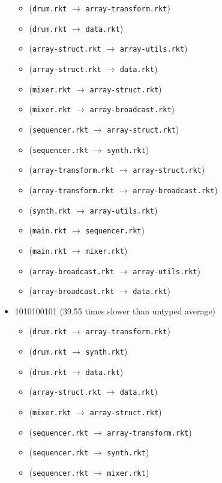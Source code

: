 \documentclass{article}
\newcommand{\mono}[1]{\texttt{#1}}
\begin{document}
\begin{itemize}
\begin{itemize}
  \item (\mono{drum.rkt} $\rightarrow$ \mono{array-transform.rkt})
  \item (\mono{drum.rkt} $\rightarrow$ \mono{data.rkt})
  \item (\mono{array-struct.rkt} $\rightarrow$ \mono{array-utils.rkt})
  \item (\mono{array-struct.rkt} $\rightarrow$ \mono{data.rkt})
  \item (\mono{mixer.rkt} $\rightarrow$ \mono{array-struct.rkt})
  \item (\mono{mixer.rkt} $\rightarrow$ \mono{array-broadcast.rkt})
  \item (\mono{sequencer.rkt} $\rightarrow$ \mono{array-struct.rkt})
  \item (\mono{sequencer.rkt} $\rightarrow$ \mono{synth.rkt})
  \item (\mono{array-transform.rkt} $\rightarrow$ \mono{array-struct.rkt})
  \item (\mono{array-transform.rkt} $\rightarrow$ \mono{array-broadcast.rkt})
  \item (\mono{synth.rkt} $\rightarrow$ \mono{array-utils.rkt})
  \item (\mono{main.rkt} $\rightarrow$ \mono{sequencer.rkt})
  \item (\mono{main.rkt} $\rightarrow$ \mono{mixer.rkt})
  \item (\mono{array-broadcast.rkt} $\rightarrow$ \mono{array-utils.rkt})
  \item (\mono{array-broadcast.rkt} $\rightarrow$ \mono{data.rkt})
  \end{itemize}
\item 1010100101 (39.55 times slower than untyped average)
  \begin{itemize}
  \item (\mono{drum.rkt} $\rightarrow$ \mono{array-transform.rkt})
  \item (\mono{drum.rkt} $\rightarrow$ \mono{synth.rkt})
  \item (\mono{drum.rkt} $\rightarrow$ \mono{data.rkt})
  \item (\mono{array-struct.rkt} $\rightarrow$ \mono{data.rkt})
  \item (\mono{mixer.rkt} $\rightarrow$ \mono{array-struct.rkt})
  \item (\mono{sequencer.rkt} $\rightarrow$ \mono{array-transform.rkt})
  \item (\mono{sequencer.rkt} $\rightarrow$ \mono{synth.rkt})
  \item (\mono{sequencer.rkt} $\rightarrow$ \mono{mixer.rkt})

\end{itemize}
\end{itemize}
\end{document}

